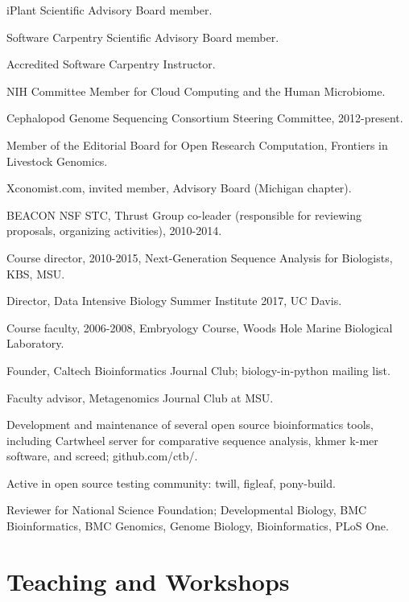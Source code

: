 \documentclass[margin,line]{resume}
\begin{document}
\begin{resume}
\begin{list1}
\item[] iPlant Scientific Advisory Board member.
\item[] Software Carpentry Scientific Advisory Board member.
\item[] Accredited Software Carpentry Instructor.
\item[] NIH Committee Member for Cloud Computing and the Human Microbiome.
\item[] Cephalopod Genome Sequencing Consortium Steering Committee, 2012-present.
\item[] Member of the Editorial Board for Open Research Computation,
Frontiers in Livestock Genomics.
\item[] Xconomist.com, invited member, Advisory Board (Michigan chapter).
\item[] BEACON NSF STC, Thrust Group co-leader (responsible for reviewing
proposals, organizing activities), 2010-2014.
\item[] Course director, 2010-2015, Next-Generation Sequence Analysis for Biologists, KBS, MSU.
\item[] Director, Data Intensive Biology Summer Institute 2017, UC Davis.
\item[] Course faculty, 2006-2008, Embryology Course, Woods Hole Marine Biological Laboratory.
\item[] Founder, Caltech Bioinformatics Journal Club; biology-in-python
mailing list.
\item[] Faculty advisor, Metagenomics Journal Club at MSU.
\item[] Development and maintenance of several open source bioinformatics tools, including
Cartwheel server for comparative sequence analysis, khmer k-mer software,
and screed; github.com/ctb/.
\item[] Active in open source testing community: twill, figleaf, pony-build.
\item[] Reviewer for National Science Foundation; Developmental Biology, BMC Bioinformatics, BMC Genomics, Genome Biology, Bioinformatics, PLoS One.
\end{list1}

\section{\mysidestyle Teaching and Workshops}

\begin{list1}


\end{list1}
\end{resume}
\end{document}
